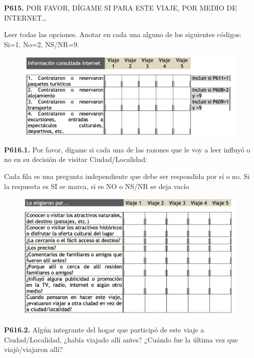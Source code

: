 \documentclass[
  openany]{book}
\begin{document}
\textbf{P615.} POR FAVOR, DÍGAME SI PARA ESTE VIAJE, POR MEDIO DE INTERNET\ldots{}

Leer todas las opciones. Anotar en cada una alguno de los siguientes códigos: Si=1, No=2, NS/NR=9.

\begin{figure}

{\centering \includegraphics[width=1\linewidth]{imagenes/figura6-223} 

}

\end{figure}

\textbf{P616.1.} Por favor, dígame si cada una de las razones que le voy a leer influyó o no en su decisión de visitar Ciudad/Localidad:

Cada fila es una pregunta independiente que debe ser respondida por sí o no. Si la respuesta es SI se marca, si es NO o NS/NR se deja vacío

\begin{figure}

{\centering \includegraphics[width=1\linewidth]{imagenes/figura6-224} 

}

\end{figure}

\textbf{P616.2.} Algún integrante del hogar que participó de este viaje a Ciudad/Localidad, ¿había viajado allí antes? ¿Cuándo fue la última vez que viajó/viajaron allí?
\end{document}
